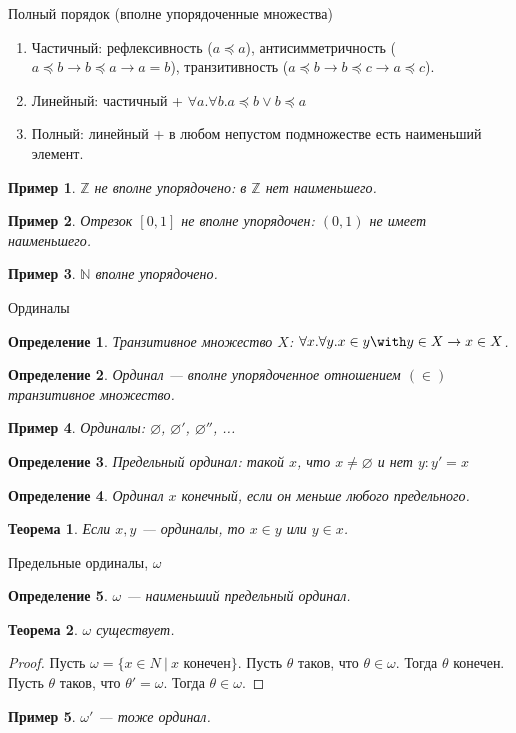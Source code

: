 \documentclass[aspectratio=169]{beamer}
\newtheorem{thm}{Теорема}[section]
\newtheorem{dfn}{Определение}[section]
\newtheorem{exm}{Пример}[section]
\begin{document}
\begin{frame}{Полный порядок (вполне упорядоченные множества)}
\begin{enumerate}
\item Частичный: рефлексивность ($a \preceq a$), антисимметричность ($a \preceq b \rightarrow b \preceq a\rightarrow a=b$),
транзитивность ($a \preceq b \rightarrow b \preceq c \rightarrow a \preceq c$).\pause
\item Линейный: частичный + $\forall a.\forall b.a \preceq b \vee b \preceq a$\pause
\item Полный: линейный + в любом непустом подмножестве есть наименьший элемент.\pause
\end{enumerate}

\begin{exm}$\mathbb{Z}$ не вполне упорядочено: в $\mathbb{Z}$ нет наименьшего.\end{exm}\pause
\begin{exm}Отрезок $[0,1]$ не вполне упорядочен: $(0,1)$ не имеет наименьшего.\end{exm}\pause
\begin{exm}$\mathbb{N}$ вполне упорядочено.\end{exm}
\end{frame}

\begin{frame}{Ординалы}
\begin{dfn}Транзитивное множество $X$: $\forall x.\forall y.x \in y \with y \in X \rightarrow x \in X$.\end{dfn}\pause
\begin{dfn}Ординал --- вполне упорядоченное отношением $(\in)$ транзитивное множество.\end{dfn}\pause
\begin{exm}Ординалы: $\varnothing$, \pause $\varnothing'$, \pause $\varnothing''$, ...\end{exm}\pause
\begin{dfn}Предельный ординал: такой $x$, что $x \ne \varnothing$ и нет $y: y' = x$\end{dfn}\pause
\begin{dfn}Ординал $x$ конечный, если он меньше любого предельного.\end{dfn}\pause
\begin{thm}Если $x,y$ --- ординалы, то $x\in y$ или $y \in x$.\end{thm}
\end{frame}
\begin{frame}{Предельные ординалы, $\omega$}
\begin{dfn}$\omega$ --- наименьший предельный ординал.\end{dfn}\pause
\begin{thm}$\omega$ существует.\end{thm}\pause
\begin{proof}Пусть $\omega = \{ x \in N\ |\ x\text{ конечен}\}$. 
Пусть $\theta$ таков, что $\theta \in \omega$. Тогда $\theta$ конечен. \pause
Пусть $\theta$ таков, что $\theta' = \omega$. Тогда $\theta \in \omega$.\end{proof}
\begin{exm}$\omega'$ --- тоже ординал.\end{exm}
\end{frame}
\end{document}
